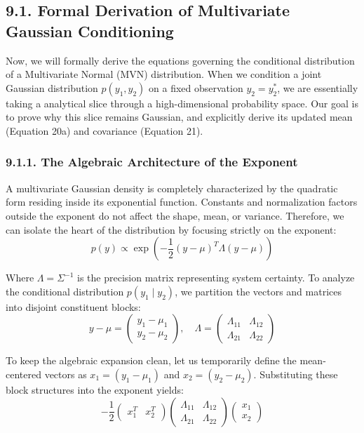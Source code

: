 \documentclass{article}
\begin{document}
\subsection*{9.1. Formal Derivation of Multivariate Gaussian Conditioning}

Now, we will formally derive the equations governing the conditional distribution of a Multivariate Normal (MVN) distribution. When we condition a joint Gaussian distribution $p(y_1, y_2)$ on a fixed observation $y_2 = y_2^*$, we are essentially taking a analytical slice through a high-dimensional probability space. Our goal is to prove why this slice remains Gaussian, and explicitly derive its updated mean (Equation 20a) and covariance (Equation 21).

\subsubsection*{9.1.1. The Algebraic Architecture of the Exponent}

A multivariate Gaussian density is completely characterized by the quadratic form residing inside its exponential function. Constants and normalization factors outside the exponent do not affect the shape, mean, or variance. Therefore, we can isolate the heart of the distribution by focusing strictly on the exponent:
\[ p(y) \propto \exp \left( -\frac{1}{2} (y - \mu)^T \Lambda (y - \mu) \right) \]

Where $\Lambda = \Sigma^{-1}$ is the precision matrix representing system certainty. To analyze the conditional distribution $p(y_1 \mid y_2)$, we partition the vectors and matrices into disjoint constituent blocks:
\[ y - \mu = \begin{pmatrix} y_1 - \mu_1 \\ y_2 - \mu_2 \end{pmatrix}, \quad \Lambda = \begin{pmatrix} \Lambda_{11} & \Lambda_{12} \\ \Lambda_{21} & \Lambda_{22} \end{pmatrix} \]

To keep the algebraic expansion clean, let us temporarily define the mean-centered vectors as $x_1 = (y_1 - \mu_1)$ and $x_2 = (y_2 - \mu_2)$. Substituting these block structures into the exponent yields:
\[ -\frac{1}{2} \begin{pmatrix} x_1^T & x_2^T \end{pmatrix} \begin{pmatrix} \Lambda_{11} & \Lambda_{12} \\ \Lambda_{21} & \Lambda_{22} \end{pmatrix} \begin{pmatrix} x_1 \\ x_2 \end{pmatrix} \]
\end{document}
